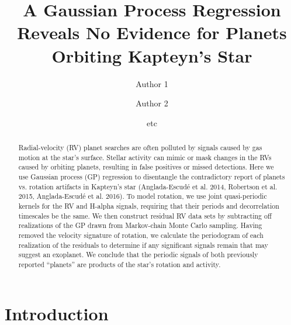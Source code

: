 \documentclass{aastex6}
\begin{document}
\pagestyle{plain}

\title{A Gaussian Process Regression Reveals No Evidence for Planets
Orbiting Kapteyn's Star}

\author{Author 1}
\author{Author 2}
\author{etc}



\begin{abstract}

  Radial-velocity (RV) planet searches are often polluted by signals caused by gas motion at the star's surface. Stellar activity can mimic or mask changes in the RVs caused by orbiting planets, resulting in false positives or missed detections.
  Here we use Gaussian process (GP) regression to disentangle the contradictory report of planets vs. rotation artifacts in Kapteyn's star (Anglada-Escud\'e et al. 2014, Robertson et al. 2015, Anglada-Escud\'e et al. 2016).
  To model rotation, we use joint quasi-periodic kernels for the RV and H-alpha signals, requiring that their periods and decorrelation timescales be the same.
  We then construct residual RV data sets by subtracting off realizations of the GP drawn from Markov-chain Monte Carlo sampling.
  Having removed the velocity signature of rotation, we calculate the periodogram of each realization of the residuals to determine if any significant signals remain that may suggest an exoplanet.
  We conclude that the periodic signals of both previously reported ``planets'' are products of the star's rotation and activity.

\end{abstract}


\maketitle

\section{Introduction}
\end{document}
